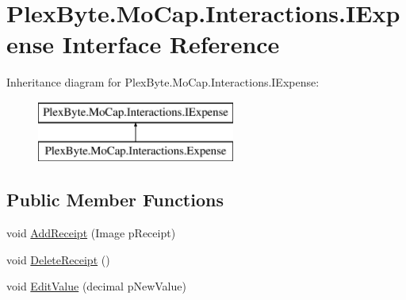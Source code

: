 \hypertarget{interface_plex_byte_1_1_mo_cap_1_1_interactions_1_1_i_expense}{}\section{Plex\+Byte.\+Mo\+Cap.\+Interactions.\+I\+Expense Interface Reference}
\label{interface_plex_byte_1_1_mo_cap_1_1_interactions_1_1_i_expense}
Inheritance diagram for Plex\+Byte.\+Mo\+Cap.\+Interactions.\+I\+Expense\+:\begin{figure}[H]
\begin{center}
\leavevmode
\includegraphics[height=2.000000cm]{interface_plex_byte_1_1_mo_cap_1_1_interactions_1_1_i_expense}
\end{center}
\end{figure}
\subsection*{Public Member Functions}
\begin{DoxyCompactItemize}
\item 
void \hyperlink{interface_plex_byte_1_1_mo_cap_1_1_interactions_1_1_i_expense_a8c87ed5e40ba6397f7c7a6b68fea9b01}{Add\+Receipt} (Image p\+Receipt)
\item 
void \hyperlink{interface_plex_byte_1_1_mo_cap_1_1_interactions_1_1_i_expense_ae5c1051bde332fa436e8521070424965}{Delete\+Receipt} ()
\item 
void \hyperlink{interface_plex_byte_1_1_mo_cap_1_1_interactions_1_1_i_expense_aba0d437cd05e76e67fc0cf544c54d85e}{Edit\+Value} (decimal p\+New\+Value)
\end{DoxyCompactItemize}
